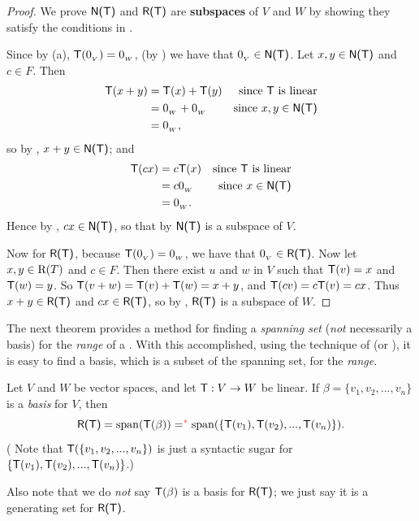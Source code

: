 \begin{proof}
We prove \(\textsf{N(T)}\) and \(\textsf{R(T)}\) are \textbf{subspaces} of \(V\) and \(W\) by showing they satisfy the conditions in .

Since by (a), \(\textsf{T}(0_{_V}) = 0_{_W}\), (by ) we have that \(0_{_V} \in \textsf{N(T)}\).
Let \(x, y \in \textsf{N(T)}\) and \(c \in F\).
Then
\begin{align*}
    \textsf{T}(x + y) & = \textsf{T}(x) + \textsf{T}(y) & \text{since \(\textsf{T}\) is linear} \\
              & = 0_{_W} + 0_{_W} & \text{since \(x, y \in \textsf{N(T)}\)} \\
              & = 0_{_W},
\end{align*}
so by , \(x + y \in \textsf{N(T)}\);
and
\begin{align*}
    \textsf{T}(cx) & = c \textsf{T}(x) & \text{since \(\textsf{T}\) is linear} \\
           & = c 0_{_W} & \text{since \(x \in \textsf{N(T)}\)} \\
           & = 0_{_W}.
\end{align*}
Hence by , \(cx \in \textsf{N(T)}\), so that by  \(\textsf{N(T)}\) is a subspace of \(V\).

Now for \(\textsf{R(T)}\), because \(\textsf{T}(0_{_V}) = 0_{_W}\), we have that \(0_{_V} \in \textsf{R(T)}\).
Now let \(x, y \in \mathrm{R}(T)\) and \(c \in F\).
Then there exist \(u\) and \(w\) in \(V\) such that \(\textsf{T}(v) = x\) and \(\textsf{T}(w) = y\).
So \(\textsf{T}(v + w) = \textsf{T}(v) + \textsf{T}(w) = x + y\), and \(\textsf{T}(cv) = c\textsf{T}(v) = cx\). Thus \(x + y \in \textsf{R(T)}\) and \(cx \in \textsf{R(T)}\), so by , \(\textsf{R(T)}\) is a subspace of \(W\).
\end{proof}

The next theorem provides a method for finding a \emph{spanning set} (\emph{not} necessarily a basis) for the \emph{range} of a \LTRAN{}.
With this accomplished, using the technique of  (or ), it is easy to find a basis, which is a subset of the spanning set, for the \emph{range}.

\begin{theorem} \label{thm 2.2}
Let \(V\) and \(W\) be vector spaces, and let \(\textsf{T} : V \to W\) be linear.
If \(\beta = \{ v_1, v_2 , ..., v_n \}\) is a \emph{basis} for \(V\), then
\[
    \RANGET = \spann(\T(\beta)) =^{\RED{*}} \spann(\{ \T(v_1), \T(v_2), ..., \T(v_n) \}).
\]
(\RED{*} Note that \(\textsf{T}(\{ v_1, v_2 , ..., v_n \})\) is just a syntactic sugar for \(\{ \textsf{T}(v_1), \textsf{T}(v_2), ..., \textsf{T}(v_n) \}\).)

Also note that we do \emph{not} say \(\textsf{T}(\beta)\) is a basis for \(\textsf{R(T)}\);
we just say it is a generating set for \(\textsf{R(T)}\).
\end{theorem}

